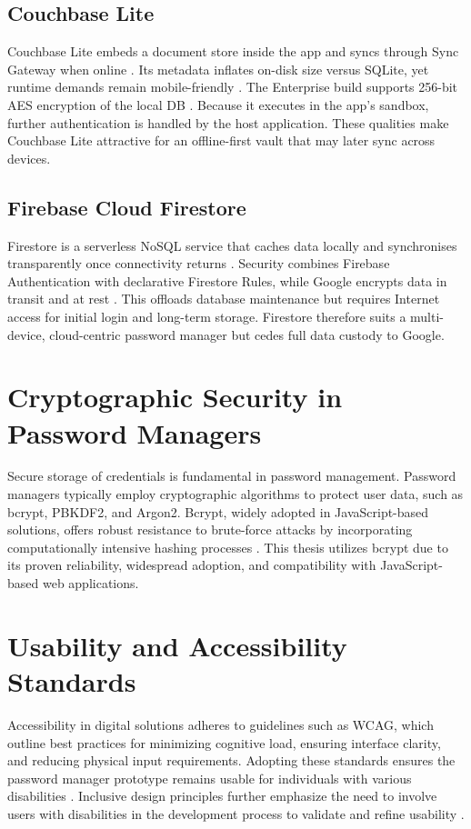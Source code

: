 \subsection*{Couchbase Lite}
Couchbase Lite embeds a document store inside the app and syncs through
Sync Gateway when online \autocite{Pal2016}.  Its metadata inflates on-disk
size versus SQLite, yet runtime demands remain mobile-friendly
\autocite{Gkamas2022}.  The Enterprise build supports 256-bit AES encryption
of the local DB \autocite{CouchbaseEncryption, CouchbaseDoc2025}.  Because it
executes in the app's sandbox, further authentication is handled by the host
application.  These qualities make Couchbase Lite attractive for an
offline-first vault that may later sync across devices.

\subsection*{Firebase Cloud Firestore}
Firestore is a serverless NoSQL service that caches data locally and
synchronises transparently once connectivity returns \autocite{FirebaseDoc2025}.
Security combines Firebase Authentication with declarative Firestore Rules,
while Google encrypts data in transit and at rest \autocite{FirebaseSecurity2025}.
This offloads database maintenance but requires Internet access for initial
login and long-term storage.  Firestore therefore suits a multi-device,
cloud-centric password manager but cedes full data custody to Google.

\section{Cryptographic Security in Password Managers}
Secure storage of credentials is fundamental in password management. Password managers typically employ cryptographic algorithms to protect user data, such as bcrypt, PBKDF2, and Argon2. Bcrypt, widely adopted in JavaScript-based solutions, offers robust resistance to brute-force attacks by incorporating computationally intensive hashing processes \autocite{Pant2022}. This thesis utilizes bcrypt due to its proven reliability, widespread adoption, and compatibility with JavaScript-based web applications.

\section{Usability and Accessibility Standards}
Accessibility in digital solutions adheres to guidelines such as WCAG, which outline best practices for minimizing cognitive load, ensuring interface clarity, and reducing physical input requirements. Adopting these standards ensures the password manager prototype remains usable for individuals with various disabilities \autocite{Brewer2023}. Inclusive design principles further emphasize the need to involve users with disabilities in the development process to validate and refine usability \autocite{Lazar2015}.



